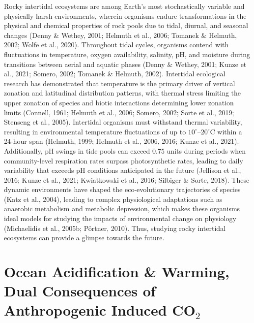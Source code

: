 \documentclass{CSUNthesis}
\begin{document}
Rocky intertidal ecosystems are among Earth's most stochastically variable and physically harsh environments, wherein organisms endure transformations in the physical and chemical properties of rock pools due to tidal, diurnal, and seasonal changes (Denny \& Wethey, 2001; Helmuth et al., 2006; Tomanek \& Helmuth, 2002; Wolfe et al., 2020). Throughout tidal cycles, organisms contend with fluctuations in temperature, oxygen availability, salinity, pH, and moisture during transitions between aerial and aquatic phases (Denny \& Wethey, 2001; Kunze et al., 2021; Somero, 2002; Tomanek \& Helmuth, 2002). Intertidal ecological research has demonstrated that temperature is the primary driver of vertical zonation and latitudinal distribution patterns, with thermal stress limiting the upper zonation of species and biotic interactions determining lower zonation limits (Connell, 1961; Helmuth et al., 2006; Somero, 2002; Sorte et al., 2019; Stenseng et al., 2005). Intertidal organisms must withstand thermal variability, resulting in environmental temperature fluctuations of up to \(10^{\circ}\)--\(20^{\circ}\)C within a 24-hour span (Helmuth, 1999; Helmuth et al., 2006, 2016; Kunze et al., 2021). Additionally, pH swings in tide pools can exceed 0.75 units during periods when community-level respiration rates surpass photosynthetic rates, leading to daily variability that exceeds pH conditions anticipated in the future (Jellison et al., 2016; Kunze et al., 2021; Kwiatkowski et al., 2016; Silbiger \& Sorte, 2018). These dynamic environments have shaped the eco-evolutionary trajectories of species (Katz et al., 2004), leading to complex physiological adaptations such as anaerobic metabolism and metabolic depression, which makes these organisms ideal models for studying the impacts of environmental change on physiology (Michaelidis et al., 2005b; Pörtner, 2010). Thus, studying rocky intertidal ecosystems can provide a glimpse towards the future.

\newpage

\section*{\texorpdfstring{Ocean Acidification \& Warming, Dual Consequences of Anthropogenic Induced CO\texorpdfstring{$_2$}{2}}{Ocean Acidification \& Warming, Dual Consequences of Anthropogenic Induced CO}}\label{ocean-acidification-warming-dual-consequences-of-anthropogenic-induced-co}
\end{document}
